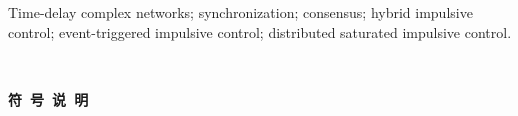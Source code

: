 \vspace*{6mm}{\bf Keywords:} 
Time-delay complex networks; synchronization; consensus; hybrid impulsive control; event-triggered impulsive control; distributed saturated impulsive control. 

\newpage
\thispagestyle{empty}~~~~~~~~~~~~~~~~~~~~~\vspace{3 mm}

\newpage
\thispagestyle{empty}
\newpage
\vskip 3mm

\begin{center}
	{\LARGE\bf 符~号~说~明}
\end{center}
